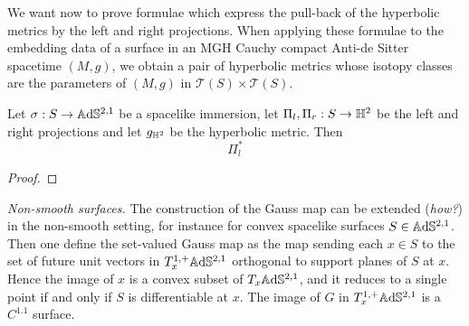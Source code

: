 We want now to prove formulae which express the pull-back of the hyperbolic metrics by the left and right projections. When applying these formulae to the embedding data of a surface in an MGH Cauchy compact Anti-de Sitter spacetime $(M,g)$, we obtain a pair of hyperbolic metrics whose isotopy classes are the parameters of $(M,g)$
in $\mathcal{T}(S)\times\mathcal{T}(S).$

\begin{proposition}
    Let $\sigma:S\to\mathbb{A}\mathrm{d}\mathbb{S}^{2,1}$ be a spacelike immersion, let $\Pi_l,\Pi_r:S\to\mathbb{H}^2$ be the left and right projections and let $g_{\mathbb{H}^2}$ be the hyperbolic metric. Then 
    \begin{equation}
        \Pi_l^*
    \end{equation}
\end{proposition}

\begin{proof}
    
\end{proof}

\textit{Non-smooth surfaces.} The construction of the Gauss map can be extended (\textit{how?}) in the non-smooth setting, for instance for convex spacelike surfaces $S\in\mathbb{A}\mathrm{d}\mathbb{S}^{2,1}$. Then one define the set-valued Gauss map as the map sending each $x\in S$ to the set of future unit vectors in $T_x^{1,+}\mathbb{A}\mathrm{d}\mathbb{S}^{2,1}$ orthogonal to support planes of $S$ at $x$. Hence the image of $x$ is a convex subset of $T_x\mathbb{A}\mathrm{d}\mathbb{S}^{2,1}$, and it reduces to a single point if and only if $S$ is differentiable at $x$. The image of $G$ in $T^{1,+}_x\mathbb{A}\mathrm{d}\mathbb{S}^{2,1}$ is a $C^{1.1}$ surface. \\
